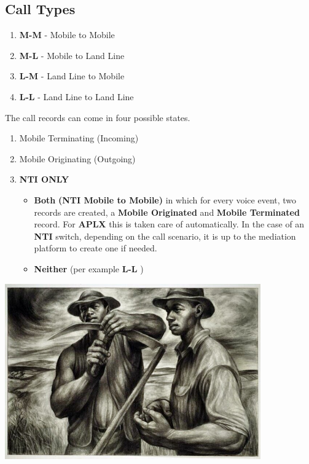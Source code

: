 \documentclass[12pt,twoside]{article}
\begin{document}
\subsection{Call Types}
\label{sec:orgheadline9}
\begin{enumerate}
\item \textbf{M-M} - Mobile to Mobile
\item \textbf{M-L} - Mobile to Land Line
\item \textbf{L-M} - Land Line to Mobile
\item \textbf{L-L} - Land Line to Land Line
\end{enumerate}
The call records can come in four possible states.
\begin{enumerate}
\item Mobile Terminating (Incoming)
\item Mobile Originating (Outgoing)
\item \textbf{NTI ONLY}
\begin{itemize}
\item \textbf{Both}  \newline \textbf{(NTI Mobile to Mobile)} in which for every voice event, two records are created, a \textbf{Mobile Originated} and \textbf{Mobile Terminated} record. For \textbf{APLX} this is taken care of automatically. In the case of an \textbf{NTI} switch, depending on the call scenario, it is up to the mediation platform to create one if needed.
\item \textbf{Neither} \newline (per example \textbf{L-L} )
\end{itemize}
\end{enumerate}
\includegraphics[width=11cm]{Pictures/white-charles-harvest_talk.jpg}
\newpage 
\end{document}
